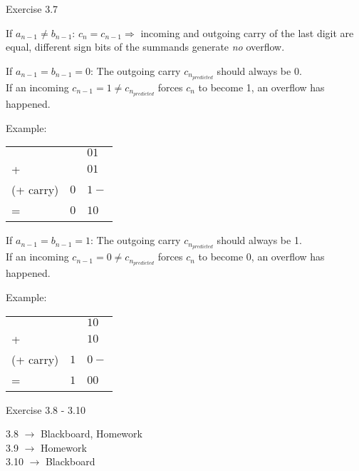 \documentclass[11pt]{tudbeamer}
\begin{document}
\begin{frame}[allowframebreaks]{Exercise 3.7}
	\begin{block}{If $a_{n-1} \neq b_{n-1}$:}
		$c_n = c_{n-1} \Rightarrow$ incoming and outgoing carry of the last digit are equal, different sign bits of the summands generate \emph{no} overflow.
	\end{block}
	
\framebreak

	\begin{block}{If $a_{n-1} = b_{n-1} = 0$:}
		The outgoing carry $c_{n_{predicted}}$ should always be 0.\\ 
		If an incoming $c_{n-1} = 1 \neq c_{n_{predicted}}$ forces $c_n$ to become 1, an overflow has happened.
	\end{block}
	
	Example:
	\begin{center}		
	\begin{tabular}{lrl}
			&		&$01$ \\
		+	&		&$01$ \\
		\hline
		(+ carry)&	$0$	&$1-$ \\
		\hline 
		=	&$0$ 	&$10$ \\
	\end{tabular}
	\end{center}
	
\framebreak
	
	\begin{block}{If $a_{n-1} = b_{n-1} = 1$:}
		The outgoing carry $c_{n_{predicted}}$ should always be 1.\\ 
		If an incoming $c_{n-1} = 0 \neq c_{n_{predicted}}$ forces $c_n$ to become 0, an overflow has happened.
	\end{block}
	
	Example:
	\begin{center}		
	\begin{tabular}{lrl}
			&		&$10$ \\
		+	&		&$10$ \\
		\hline
		(+ carry)&	$1$	&$0-$ \\
		\hline 
		=	&$1$ 	&$00$ \\
	\end{tabular}
	\end{center}

\end{frame}

\begin{frame}{Exercise 3.8 - 3.10}
	
	3.8 $\rightarrow$ Blackboard, Homework\\
	3.9 $\rightarrow$ Homework\\
	3.10 $\rightarrow$ Blackboard

\end{frame}
\end{document}
